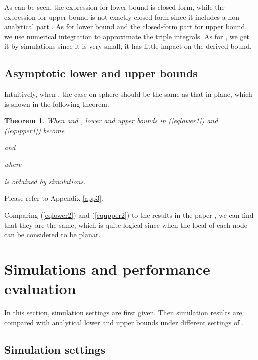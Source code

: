 \documentclass[journal, twoside]{IEEEtran}
\newtheorem{theorem}{Theorem}
\begin{document}
As can be seen, the expression for lower bound is closed-form, while the expression for upper bound is not 
exactly closed-form since it includes a non-analytical part . As for lower bound and the 
closed-form part for upper bound, we use numerical integration to approximate the triple integrals. As for 
, we get it by simulations since it is very small, it has little impact on the derived bound.


\subsection{Asymptotic lower and upper bounds}

Intuitively, when , the case on sphere should be the same as 
that in plane, which is shown in the following theorem.

\begin{theorem} \label{theo2}
When  and , lower and upper bounds in \emph{(\ref{eqlower1})} and \emph{(\ref{equpper1})}
become 
	
	and 
	
	where 
	
	
	
	 is obtained by simulations.
\end{theorem}

\begin{IEEEproof}
Please refer to Appendix \ref{app3}.
\end{IEEEproof}

Comparing (\ref{eqlower2}) and (\ref{equpper2}) to the results in the paper \cite{YMD12},
we can find that they are the same, which is quite logical since when  the local
of each node can be considered to be planar. 


















\section{Simulations and performance evaluation}

In this section, simulation settings are first given. Then simulation 
results are compared with analytical lower and upper bounds under 
different settings of .

\subsection{Simulation settings}
\end{document}
